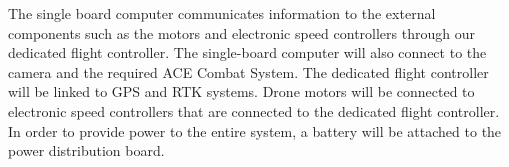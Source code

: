 
The single board computer communicates information to the external components such as the motors and electronic speed controllers through our dedicated flight controller. The single-board computer will also connect to the camera and the required ACE Combat System. The dedicated flight controller will be linked to GPS and RTK systems. Drone motors will be connected to electronic speed controllers that are connected to the dedicated flight controller. In order to provide power to the entire system, a battery will be attached to the power distribution board.
